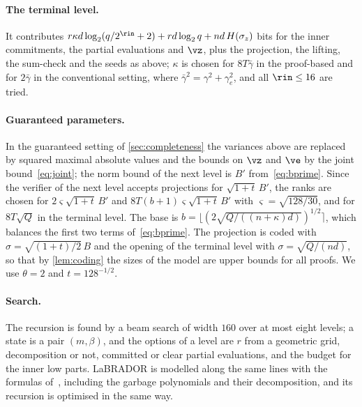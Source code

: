 \paragraph{The terminal level.}
It contributes $r\kappa d\log_2(q/2^{\rin}+2)+rd\log_2q+nd\,H(\sigma_z)$ bits for the inner commitments, the partial evaluations and $\vz$, plus the projection, the lifting, the sum-check and the seeds as above; $\kappa$ is chosen for $8T\bar\gamma$ in the proof-based and for $2\bar\gamma$ in the conventional setting, where $\bar\gamma^2=\gamma^2+\gamma_e^2$, and all $\rin\le16$ are tried.

\paragraph{Guaranteed parameters.}
In the guaranteed setting of \cref{sec:completeness} the variances above are replaced by squared maximal absolute values and the bounds on $\vz$ and $\ve$ by the joint bound~\eqref{eq:joint}; the norm bound of the next level is $B'$ from~\eqref{eq:bprime}. Since the verifier of the next level accepts projections for $\sqrt{1+t}\,B'$, the ranks are chosen for $2\varsigma\sqrt{1+t}\,B'$ and $8T(b+1)\varsigma\sqrt{1+t}\,B'$ with $\varsigma=\sqrt{128/30}$, and for $8T\sqrt Q$ in the terminal level. The base is $b=\lfloor(2\sqrt{Q/((n+\kappa)d)})^{1/2}\rceil$, which balances the first two terms of~\eqref{eq:bprime}. The projection is coded with $\sigma=\sqrt{(1+t)/2}\,B$ and the opening of the terminal level with $\sigma=\sqrt{Q/(nd)}$, so that by \cref{lem:coding} the sizes of the model are upper bounds for all proofs. We use $\theta=2$ and $t=128^{-1/2}$.

\paragraph{Search.}
The recursion is found by a beam search of width $160$ over at most eight levels; a state is a pair $(m,\beta)$, and the options of a level are $r$ from a geometric grid, decomposition or not, committed or clear partial evaluations, and the budget for the inner low parts. LaBRADOR is modelled along the same lines with the formulas of~\cite[Section~5]{BS23}, including the garbage polynomials and their decomposition, and its recursion is optimised in the same way.

